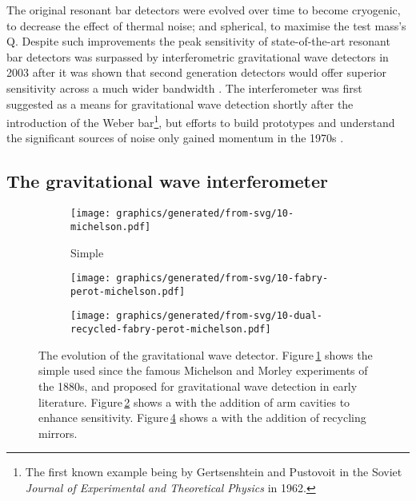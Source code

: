 The original resonant bar detectors were evolved over time to become cryogenic, to decrease the effect of thermal noise; and spherical, to maximise the test mass's Q. Despite such improvements the peak sensitivity of state-of-the-art resonant bar detectors was surpassed by interferometric gravitational wave detectors in 2003 \cite{Pitkin2011} after it was shown that second generation detectors would offer superior sensitivity across a much wider bandwidth \cite{Harry2002a}. The interferometer was first suggested as a means for gravitational wave detection shortly after the introduction of the Weber bar\footnote{The first known example being by Gertsenshtein and Pustovoit in the Soviet \emph{Journal of Experimental and Theoretical Physics} in 1962.}, but efforts to build prototypes and understand the significant sources of noise only gained momentum in the 1970s \cite{Moss1971, Weiss1972}.

\subsection{\label{sec:gw-interferometry}The gravitational wave interferometer}

\begin{figure}
  \begin{center}
    \begin{subfigure}{.3\textwidth}
      \texttt{[image: graphics/generated/from-svg/10-michelson.pdf]}
      \caption{Simple \MI{}}
      \label{fig:mi}
    \end{subfigure}
    \hfill
    \begin{subfigure}{.3\textwidth}
      \texttt{[image: graphics/generated/from-svg/10-fabry-perot-michelson.pdf]}
      \caption{\FPMI{}}
      \label{fig:fpmi}
    \end{subfigure}
    \hfill
    \begin{subfigure}{.3\textwidth}
      \texttt{[image: graphics/generated/from-svg/10-dual-recycled-fabry-perot-michelson.pdf]}
      \caption{\DRFPMI{}}
      \label{fig:drfpmi}
    \end{subfigure}
    \caption[The evolution of the gravitational wave detector]{The evolution of the gravitational wave detector. Figure\,\ref{fig:mi} shows the simple \MI{} used since the famous Michelson and Morley experiments of the 1880s, and proposed for gravitational wave detection in early literature. Figure\,\ref{fig:fpmi} shows a \MI{} with the addition of \FP{} arm cavities to enhance sensitivity. Figure\,\ref{fig:drfpmi} shows a \FPMI{} with the addition of recycling mirrors.}
  \end{center}
\end{figure}

